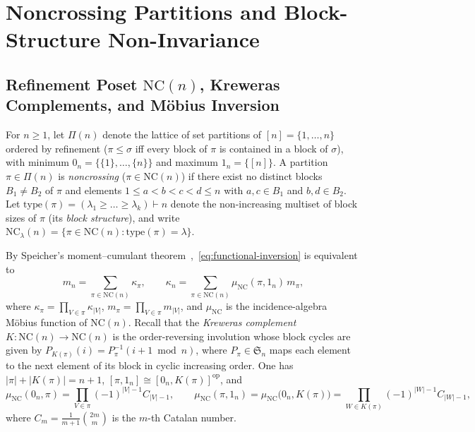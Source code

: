 \documentclass[11pt]{article}
\theoremstyle{definition}
\newcommand{\NC}{\mathrm{NC}}
\newcommand{\btype}{\mathrm{type}}
\newcommand{\Krew}{K}
\begin{document}
\section{Noncrossing Partitions and Block-Structure Non-Invariance}

\subsection{Refinement Poset \texorpdfstring{$\NC(n)$}{NC(n)}, Kreweras Complements, and \texorpdfstring{M\"obius}{Mobius} Inversion}
For $n \ge 1$, let $\Pi(n)$ denote the lattice of set partitions of $[n] = \{1,\dots,n\}$ ordered by refinement ($\pi \le \sigma$ iff every block of $\pi$ is contained in a block of $\sigma$), with minimum $0_n = \{\{1\},\dots,\{n\}\}$ and maximum $1_n = \{[n]\}$. A partition $\pi \in \Pi(n)$ is \emph{noncrossing} ($\pi \in \NC(n)$) if there exist no distinct blocks $B_1 \neq B_2$ of $\pi$ and elements $1 \le a < b < c < d \le n$ with $a,c \in B_1$ and $b,d \in B_2$. Let $\btype(\pi) = (\lambda_1 \ge \dots \ge \lambda_k) \vdash n$ denote the non-increasing multiset of block sizes of $\pi$ (its \emph{block structure}), and write $\NC_\lambda(n) = \{\pi \in \NC(n) : \btype(\pi) = \lambda\}$.

By Speicher's moment--cumulant theorem~\cite[Lecture~11]{NicaSpeicher2006},~\eqref{eq:functional-inversion} is equivalent to
\begin{equation}\label{eq:moment-cumulant}
  m_n = \sum_{\pi \in \NC(n)} \kappa_\pi, \qquad
  \kappa_n = \sum_{\pi \in \NC(n)} \mu_{\NC}(\pi, 1_n)\,m_\pi,
\end{equation}
where $\kappa_\pi = \prod_{V \in \pi} \kappa_{|V|}$, $m_\pi = \prod_{V \in \pi} m_{|V|}$, and $\mu_{\NC}$ is the incidence-algebra M\"obius function of $\NC(n)$. Recall that the \emph{Kreweras complement} $\Krew : \NC(n) \to \NC(n)$ is the order-reversing involution whose block cycles are given by $P_{\Krew(\pi)}(i) = P_\pi^{-1}(i + 1 \bmod n)$, where $P_\pi \in \mathfrak{S}_n$ maps each element to the next element of its block in cyclic increasing order. One has $|\pi| + |\Krew(\pi)| = n + 1$, $[\pi, 1_n] \cong [0_n, \Krew(\pi)]^{\mathrm{op}}$, and
\begin{equation}\label{eq:mobius-formulas}
  \mu_{\NC}(0_n, \pi) = \prod_{V \in \pi} (-1)^{|V|-1} C_{|V|-1}, \qquad
  \mu_{\NC}(\pi, 1_n) = \mu_{\NC}\bigl(0_n, \Krew(\pi)\bigr) = \prod_{W \in \Krew(\pi)} (-1)^{|W|-1} C_{|W|-1},
\end{equation}
where $C_m = \frac{1}{m+1}\binom{2m}{m}$ is the $m$-th Catalan number.
\end{document}
